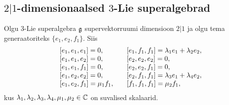 
\subsection{\texorpdfstring{$2|1$}{2|1}-dimensionaalsed
    \texorpdfstring{$3$}{3}-Lie superalgebrad}

Olgu $3$-Lie superalgebra $\mathfrak{g}$ supervektorruumi dimensioon
$2|1$ ja olgu tema generaatoriteks $\{ e_1, e_2, f_1 \}$. Siis
\begin{align*}
    \begin{matrix*}[l]
        & [e_1, e_1, e_1] = 0, \quad
        & [e_1, f_1, f_1] = \l_1 e_1 + \l_2 e_2, \\
        & [e_1, e_1, e_2] = 0, \quad
        & [e_2, e_2, e_2] = 0, \\
        & [e_1, e_1, f_1] = 0, \quad
        & [e_2, e_2, f_1] = 0, \\
        & [e_1, e_2, e_2] = 0, \quad
        & [e_2, f_1, f_1] = \l_3 e_1 +\l_4 e_2, \\
        & [e_1, e_2, f_1] = \m_1 f_1, \quad
        & [f_1, f_1, f_1] = \m_2 f_1,
    \end{matrix*}
\end{align*}
kus $\lambda_1, \lambda_2, \lambda_3, \lambda_4, \mu_1, \mu_2 \in \mathbb{C}$ on suvalised skalaarid.

